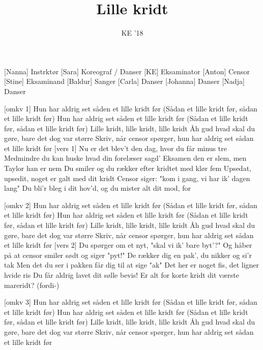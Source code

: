 \documentclass[a4paper,11pt]{article}
\title{Lille kridt}
\author{KE '18}
\begin{document}
\maketitle

\begin{roles}
[Nanna] Instrktør
[Sara] Koreograf / Danser
[KE] Eksaminator
[Anton] Censor
[Stine] Eksaminand
[Baldur] Sanger
[Carla] Danser
[Johanna] Danser
[Nadja] Danser
\end{roles}

\begin{song}
   [omkv 1] Hun har aldrig set såden et lille kridt før
(Sådan et lille kridt før, sådan et lille kridt før)
Hun har aldrig set såden et lille kridt før
(Sådan et lille kridt før, sådan et lille kridt før)
Lille kridt, lille kridt, lille kridt
Åh gud hvad skal du gøre, bare det dog var større
Skriv, når censor spørger, hun har aldrig set sådan et lille kridt før
     [vers 1]%
    Nu er det blev't den dag, hvor du får minus tre
Medmindre du kan huske hvad din forelæser sagd'
Eksamen den er slem, men Taylor han er nem
Du smiler og du rækker efter kridtet med klør fem
Upsedat, upsedit, noget er galt med dit kridt
Censor siger: "kom i gang, vi har ik' dagen lang"
Du bli'r bleg i dit hov'd, og du mister alt dit mod, for

  [omkv 2]%
  Hun har aldrig set såden et lille kridt før
(Sådan et lille kridt før, sådan et lille kridt før)
Hun har aldrig set såden et lille kridt før
(Sådan et lille kridt før, sådan et lille kridt før)
Lille kridt, lille kridt, lille kridt
Åh gud hvad skal du gøre, bare det dog var større
Skriv, når censor spørger, hun har aldrig set sådan et lille kridt før
     [vers 2]%
    Du spørger om et nyt, "skal vi ik' bare byt'?"
Og håber på at censor smiler sødt og siger "pyt!"
De rækker dig en pak', du nikker og si'r tak
Men det du ser i pakken får dig til at sige "ak"
Det her er noget fis, det ligner hvide ris
Du får aldrig lavet dit sølle bevis!
Er alt for korte kridt dit værste mareridt? (fordi-)

     [omkv 3]%
    Hun har aldrig set såden et lille kridt før
(Sådan et lille kridt før, sådan et lille kridt før)
Hun har aldrig set såden et lille kridt før
(Sådan et lille kridt før, sådan et lille kridt før)
Lille kridt, lille kridt, lille kridt
Åh gud hvad skal du gøre, bare det dog var større
Skriv, når censor spørger, hun har aldrig set sådan et lille kridt før

\end{song}
\end{document}
